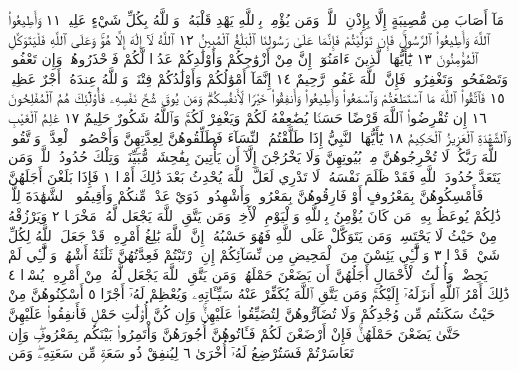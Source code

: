 مَآ أَصَابَ مِن مُّصِيبَةٍ إِلَّا بِإِذْنِ ٱللَّهِۗ وَمَن يُؤْمِنۢ بِٱللَّهِ
يَهْدِ قَلْبَهُۥۚ وَٱللَّهُ بِكُلِّ شَيْءٍ عَلِيمࣱ ١١ وَأَطِيعُوا۟ ٱللَّهَ
وَأَطِيعُوا۟ ٱلرَّسُولَۚ فَإِن تَوَلَّيْتُمْ فَإِنَّمَا عَلَىٰ رَسُولِنَا ٱلْبَلَٰغُ
ٱلْمُبِينُ ١٢ ٱللَّهُ لَآ إِلَٰهَ إِلَّا هُوَۚ وَعَلَى ٱللَّهِ فَلْيَتَوَكَّلِ
ٱلْمُؤْمِنُونَ ١٣ يَٰٓأَيُّهَا ٱلَّذِينَ ءَامَنُوٓا۟ إِنَّ مِنْ أَزْوَٰجِكُمْ
وَأَوْلَٰدِكُمْ عَدُوࣰّا لَّكُمْ فَٱحْذَرُوهُمْۚ وَإِن تَعْفُوا۟
وَتَصْفَحُوا۟ وَتَغْفِرُوا۟ فَإِنَّ ٱللَّهَ غَفُورࣱ رَّحِيمٌ ١٤ إِنَّمَآ
أَمْوَٰلُكُمْ وَأَوْلَٰدُكُمْ فِتْنَةࣱۚ وَٱللَّهُ عِندَهُۥٓ أَجْرٌ
عَظِيمࣱ ١٥ فَٱتَّقُوا۟ ٱللَّهَ مَا ٱسْتَطَعْتُمْ وَٱسْمَعُوا۟ وَأَطِيعُوا۟
وَأَنفِقُوا۟ خَيْرࣰا لِّأَنفُسِكُمْۗ وَمَن يُوقَ شُحَّ نَفْسِهِۦ
فَأُو۟لَٰٓئِكَ هُمُ ٱلْمُفْلِحُونَ ١٦ إِن تُقْرِضُوا۟ ٱللَّهَ قَرْضًا
حَسَنࣰا يُضَٰعِفْهُ لَكُمْ وَيَغْفِرْ لَكُمْۚ وَٱللَّهُ شَكُورٌ
حَلِيمٌ ١٧ عَٰلِمُ ٱلْغَيْبِ وَٱلشَّهَٰدَةِ ٱلْعَزِيزُ ٱلْحَكِيمُ ١٨
يَٰٓأَيُّهَا ٱلنَّبِيُّ إِذَا طَلَّقْتُمُ ٱلنِّسَآءَ فَطَلِّقُوهُنَّ لِعِدَّتِهِنَّ وَأَحْصُوا۟ ٱلْعِدَّةَۖ
وَٱتَّقُوا۟ ٱللَّهَ رَبَّكُمْۖ لَا تُخْرِجُوهُنَّ مِنۢ بُيُوتِهِنَّ وَلَا يَخْرُجْنَ إِلَّآ أَن
يَأْتِينَ بِفَٰحِشَةࣲ مُّبَيِّنَةࣲۚ وَتِلْكَ حُدُودُ ٱللَّهِۚ وَمَن يَتَعَدَّ حُدُودَ ٱللَّهِ
فَقَدْ ظَلَمَ نَفْسَهُۥۚ لَا تَدْرِي لَعَلَّ ٱللَّهَ يُحْدِثُ بَعْدَ ذَٰلِكَ أَمْرࣰا ١
فَإِذَا بَلَغْنَ أَجَلَهُنَّ فَأَمْسِكُوهُنَّ بِمَعْرُوفٍ أَوْ فَارِقُوهُنَّ بِمَعْرُوفࣲ
وَأَشْهِدُوا۟ ذَوَيْ عَدْلࣲ مِّنكُمْ وَأَقِيمُوا۟ ٱلشَّهَٰدَةَ لِلَّهِۚ ذَٰلِكُمْ يُوعَظُ بِهِۦ
مَن كَانَ يُؤْمِنُ بِٱللَّهِ وَٱلْيَوْمِ ٱلْأٓخِرِۚ وَمَن يَتَّقِ ٱللَّهَ يَجْعَل لَّهُۥ مَخْرَجࣰا ٢
وَيَرْزُقْهُ مِنْ حَيْثُ لَا يَحْتَسِبُۚ وَمَن يَتَوَكَّلْ عَلَى ٱللَّهِ فَهُوَ حَسْبُهُۥٓۚ
إِنَّ ٱللَّهَ بَٰلِغُ أَمْرِهِۦۚ قَدْ جَعَلَ ٱللَّهُ لِكُلِّ شَيْءࣲ قَدْرࣰا ٣ وَٱلَّٰٓـِٔي يَئِسْنَ
مِنَ ٱلْمَحِيضِ مِن نِّسَآئِكُمْ إِنِ ٱرْتَبْتُمْ فَعِدَّتُهُنَّ ثَلَٰثَةُ أَشْهُرࣲ
وَٱلَّٰٓـِٔي لَمْ يَحِضْنَۚ وَأُو۟لَٰتُ ٱلْأَحْمَالِ أَجَلُهُنَّ أَن يَضَعْنَ حَمْلَهُنَّۚ
وَمَن يَتَّقِ ٱللَّهَ يَجْعَل لَّهُۥ مِنْ أَمْرِهِۦ يُسْرࣰا ٤ ذَٰلِكَ أَمْرُ ٱللَّهِ أَنزَلَهُۥٓ
إِلَيْكُمْۚ وَمَن يَتَّقِ ٱللَّهَ يُكَفِّرْ عَنْهُ سَيِّـَٔاتِهِۦ وَيُعْظِمْ لَهُۥٓ أَجْرًا ٥
أَسْكِنُوهُنَّ مِنْ حَيْثُ سَكَنتُم مِّن وُجْدِكُمْ وَلَا تُضَآرُّوهُنَّ لِتُضَيِّقُوا۟
عَلَيْهِنَّۚ وَإِن كُنَّ أُو۟لَٰتِ حَمْلࣲ فَأَنفِقُوا۟ عَلَيْهِنَّ حَتَّىٰ يَضَعْنَ حَمْلَهُنَّۚ فَإِنْ
أَرْضَعْنَ لَكُمْ فَـَٔاتُوهُنَّ أُجُورَهُنَّ وَأْتَمِرُوا۟ بَيْنَكُم بِمَعْرُوفࣲۖ وَإِن
تَعَاسَرْتُمْ فَسَتُرْضِعُ لَهُۥٓ أُخْرَىٰ ٦ لِيُنفِقْ ذُو سَعَةࣲ مِّن سَعَتِهِۦۖ وَمَن
